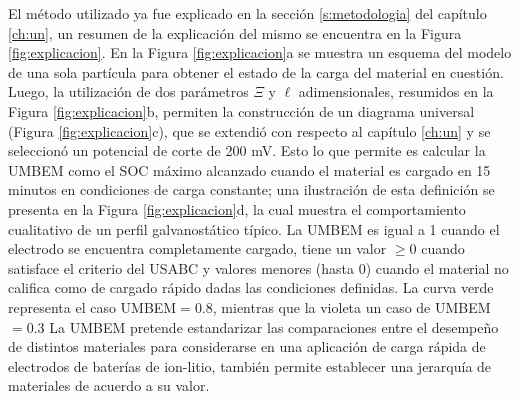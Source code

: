 El método utilizado ya fue explicado en la sección \ref{s:metodologia} del
capítulo \ref{ch:un}, un resumen de la explicación del mismo se encuentra 
en la Figura \ref{fig:explicacion}. En la Figura \ref{fig:explicacion}a se 
muestra un esquema del modelo de una sola partícula para obtener el estado
de la carga del material en cuestión. Luego, la utilización de dos parámetros
$\Xi$ y $\ell$ adimensionales, resumidos en la Figura \ref{fig:explicacion}b,
permiten la construcción de un diagrama universal (Figura 
\ref{fig:explicacion}c), que se extendió con respecto al capítulo \ref{ch:un}
y se seleccionó un potencial de corte de 200 mV. Esto lo que permite es 
calcular la UMBEM como el SOC máximo alcanzado cuando el material es cargado
en 15 minutos en condiciones de carga constante; una ilustración de esta 
definición se presenta en la Figura \ref{fig:explicacion}d, la cual muestra 
el comportamiento cualitativo de un perfil galvanostático típico. La UMBEM
es igual a 1 cuando el electrodo se encuentra completamente cargado, tiene
un valor $\geq 0$ cuando satisface el criterio del USABC \cite{USABC} y
valores menores (hasta 0) cuando el material no califica como de cargado 
rápido dadas las condiciones definidas. La curva verde representa el caso 
UMBEM$ = 0.8$, mientras que la violeta un caso de UMBEM$ = 0.3$ La UMBEM 
pretende estandarizar las comparaciones entre el desempeño de distintos 
materiales para considerarse en una aplicación de carga rápida de electrodos
de baterías de ion-litio, también permite establecer una jerarquía de 
materiales de acuerdo a su valor.
